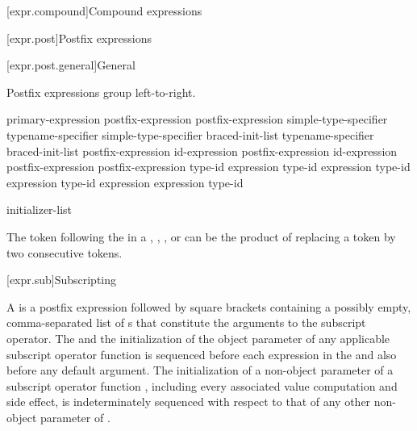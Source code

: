 [expr.compound]{Compound expressions}

[expr.post]{Postfix expressions}%

[expr.post.general]{General}%

\pnum
Postfix expressions group left-to-right.

\begin{bnf}
\br
    primary-expression\br
    postfix-expression \terminal{[}  \terminal{]}\br
    postfix-expression \terminal{(}  \terminal{)}\br
    simple-type-specifier \terminal{(}  \terminal{)}\br
    typename-specifier \terminal{(}  \terminal{)}\br
    simple-type-specifier braced-init-list\br
    typename-specifier braced-init-list\br
    postfix-expression   id-expression\br
    postfix-expression \terminal{->}  id-expression\br
    postfix-expression \terminal{++}\br
    postfix-expression \terminal{--}\br
     \terminal{<} type-id \terminal{>} \terminal{(} expression \terminal{)}\br
     \terminal{<} type-id \terminal{>} \terminal{(} expression \terminal{)}\br
     \terminal{<} type-id \terminal{>} \terminal{(} expression \terminal{)}\br
     \terminal{<} type-id \terminal{>} \terminal{(} expression \terminal{)}\br
     \terminal{(} expression \terminal{)}\br
     \terminal{(} type-id \terminal{)}
\end{bnf}

\begin{bnf}
\br
    initializer-list
\end{bnf}

\pnum
\begin{note}
The \tcode{>} token following the
 in a ,
, , or
 can be the product of replacing a
\tcode{>>} token by two consecutive \tcode{>}
tokens.
\end{note}

[expr.sub]{Subscripting}

\pnum
{}%
%
A  is a postfix expression
followed by square brackets containing
a possibly empty, comma-separated list of s
that constitute the arguments to the subscript operator.
The  and
the initialization of the object parameter of
any applicable subscript operator function is sequenced before
each expression in the  and also before
any default argument.
The initialization of a non-object parameter of
a subscript operator function ,
including every associated value computation and side effect,
is indeterminately sequenced with respect to that of
any other non-object parameter of .

